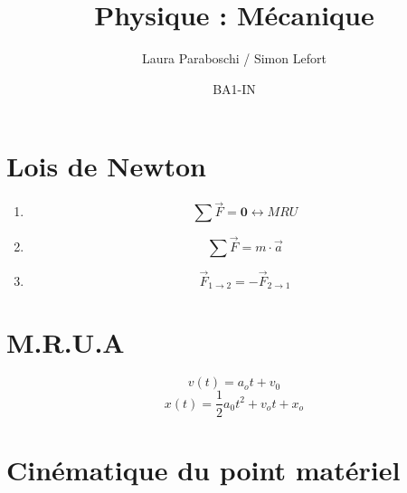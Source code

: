 \documentclass{article}
\title{Physique : Mécanique}
\author{Laura Paraboschi / Simon Lefort}
\date{BA1-IN}
\begin{document}
\maketitle

\section{Lois de Newton}

\begin{enumerate}
    \item \[ \sum\overrightarrow{F} = \textbf{0} \leftrightarrow MRU \] 
    \item \[ \sum\overrightarrow{F} = m \cdot \overrightarrow{a}  \] 
    \item \[ \overrightarrow{F}_{1 \rightarrow 2} = -\overrightarrow{F} _{2 \rightarrow 1} \]
\end{enumerate}


\section{M.R.U.A}

\[ v(t) = a_ot + v_0 \]
\[ x(t) = \frac{1}{2}a_0t^2 + v_ot + x_o \]

\section{Cinématique du point matériel}
\end{document}
